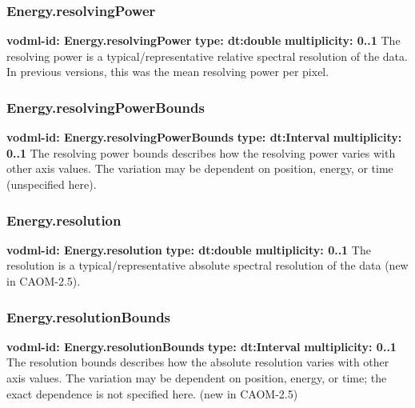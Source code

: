     \subsubsection{Energy.resolvingPower}
      \textbf{vodml-id: Energy.resolvingPower} \newline
      \textbf{type: dt:double} \newline
      \textbf{multiplicity: 0..1} \newline
      The resolving power is a typical/representative relative spectral resolution of the data. In previous versions, this was the mean resolving power per pixel.

    \subsubsection{Energy.resolvingPowerBounds}
      \textbf{vodml-id: Energy.resolvingPowerBounds} \newline
      \textbf{type: dt:Interval} \newline
      \textbf{multiplicity: 0..1} \newline
      The resolving power bounds describes how the resolving power varies with other axis values. The variation may be dependent on position, energy, or time (unspecified here).

    \subsubsection{Energy.resolution}
      \textbf{vodml-id: Energy.resolution} \newline
      \textbf{type: dt:double} \newline
      \textbf{multiplicity: 0..1} \newline
      The resolution is a typical/representative absolute spectral resolution of the data (new in CAOM-2.5).

    \subsubsection{Energy.resolutionBounds}
      \textbf{vodml-id: Energy.resolutionBounds} \newline
      \textbf{type: dt:Interval} \newline
      \textbf{multiplicity: 0..1} \newline
      The resolution bounds describes how the absolute resolution varies with other axis values. The variation may be dependent on position, energy, or time; the exact dependence is not specified here. (new in CAOM-2.5)

